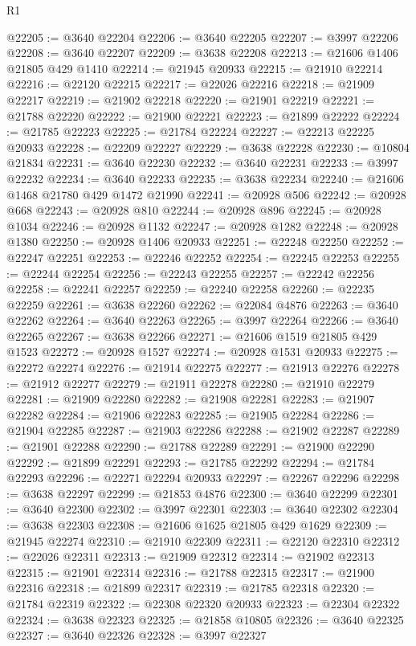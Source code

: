 \begin{lexlean}{R1}
\begin{coremodule}
@22205 := @3640 @22204
@22206 := @3640 @22205
@22207 := @3997 @22206
@22208 := @3640 @22207
@22209 := @3638 @22208
@22213 := @21606 @1406 @21805 @429 @1410
@22214 := @21945 @20933
@22215 := @21910 @22214
@22216 := @22120 @22215
@22217 := @22026 @22216
@22218 := @21909 @22217
@22219 := @21902 @22218
@22220 := @21901 @22219
@22221 := @21788 @22220
@22222 := @21900 @22221
@22223 := @21899 @22222
@22224 := @21785 @22223
@22225 := @21784 @22224
@22227 := @22213 @22225 @20933
@22228 := @22209 @22227
@22229 := @3638 @22228
@22230 := @10804 @21834
@22231 := @3640 @22230
@22232 := @3640 @22231
@22233 := @3997 @22232
@22234 := @3640 @22233
@22235 := @3638 @22234
@22240 := @21606 @1468 @21780 @429 @1472 @21990
@22241 := @20928 @506
@22242 := @20928 @668
@22243 := @20928 @810
@22244 := @20928 @896
@22245 := @20928 @1034
@22246 := @20928 @1132
@22247 := @20928 @1282
@22248 := @20928 @1380
@22250 := @20928 @1406 @20933
@22251 := @22248 @22250
@22252 := @22247 @22251
@22253 := @22246 @22252
@22254 := @22245 @22253
@22255 := @22244 @22254
@22256 := @22243 @22255
@22257 := @22242 @22256
@22258 := @22241 @22257
@22259 := @22240 @22258
@22260 := @22235 @22259
@22261 := @3638 @22260
@22262 := @22084 @4876
@22263 := @3640 @22262
@22264 := @3640 @22263
@22265 := @3997 @22264
@22266 := @3640 @22265
@22267 := @3638 @22266
@22271 := @21606 @1519 @21805 @429 @1523
@22272 := @20928 @1527
@22274 := @20928 @1531 @20933
@22275 := @22272 @22274
@22276 := @21914 @22275
@22277 := @21913 @22276
@22278 := @21912 @22277
@22279 := @21911 @22278
@22280 := @21910 @22279
@22281 := @21909 @22280
@22282 := @21908 @22281
@22283 := @21907 @22282
@22284 := @21906 @22283
@22285 := @21905 @22284
@22286 := @21904 @22285
@22287 := @21903 @22286
@22288 := @21902 @22287
@22289 := @21901 @22288
@22290 := @21788 @22289
@22291 := @21900 @22290
@22292 := @21899 @22291
@22293 := @21785 @22292
@22294 := @21784 @22293
@22296 := @22271 @22294 @20933
@22297 := @22267 @22296
@22298 := @3638 @22297
@22299 := @21853 @4876
@22300 := @3640 @22299
@22301 := @3640 @22300
@22302 := @3997 @22301
@22303 := @3640 @22302
@22304 := @3638 @22303
@22308 := @21606 @1625 @21805 @429 @1629
@22309 := @21945 @22274
@22310 := @21910 @22309
@22311 := @22120 @22310
@22312 := @22026 @22311
@22313 := @21909 @22312
@22314 := @21902 @22313
@22315 := @21901 @22314
@22316 := @21788 @22315
@22317 := @21900 @22316
@22318 := @21899 @22317
@22319 := @21785 @22318
@22320 := @21784 @22319
@22322 := @22308 @22320 @20933
@22323 := @22304 @22322
@22324 := @3638 @22323
@22325 := @21858 @10805
@22326 := @3640 @22325
@22327 := @3640 @22326
@22328 := @3997 @22327

\end{coremodule}
\end{lexlean}

